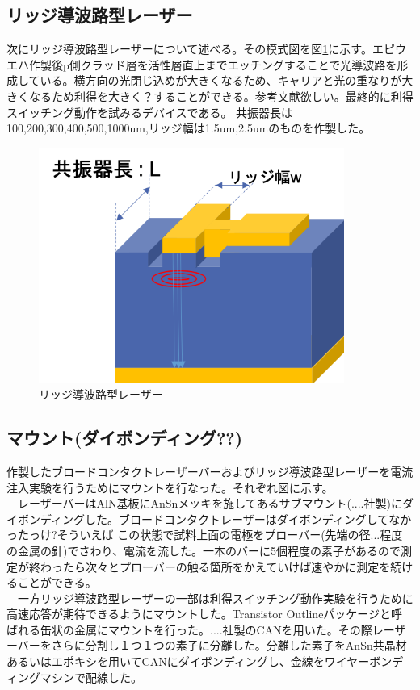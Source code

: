 \subsection{リッジ導波路型レーザー}%
次にリッジ導波路型レーザーについて述べる。その模式図を図\ref{fig_2_1_ridge}に示す。エピウエハ作製後p側クラッド層を活性層直上までエッチングすることで光導波路を形成している。横方向の光閉じ込めが大きくなるため、キャリアと光の重なりが大きくなるため利得を大きく？することができる。参考文献欲しい。最終的に利得スイッチング動作を試みるデバイスである。
共振器長は100,200,300,400,500,1000um,リッジ幅は1.5um,2.5umのものを作製した。
\begin{figure}[t]
	\centering
	\includegraphics[width=10cm]{figure/fig_2_1_ridge.png}
	\caption{リッジ導波路型レーザー}
	\label{fig_2_1_ridge}
\end{figure}

\subsection{マウント(ダイボンディング??)}%
作製したブロードコンタクトレーザーバーおよびリッジ導波路型レーザーを電流注入実験を行うためにマウントを行なった。それぞれ図に示す。\\
　レーザーバーはAlN基板にAnSnメッキを施してあるサブマウント(....社製)にダイボンディングした。ブロードコンタクトレーザーはダイボンディングしてなかったっけ?そういえば
この状態で試料上面の電極をプローバー(先端の径...程度の金属の針)でさわり、電流を流した。一本のバーに5個程度の素子があるので測定が終わったら次々とプローバーの触る箇所をかえていけば速やかに測定を続けることができる。\\
　一方リッジ導波路型レーザーの一部は利得スイッチング動作実験を行うために高速応答が期待できるようにマウントした。Transistor Outlineパッケージと呼ばれる缶状の金属にマウントを行った。....社製のCANを用いた。その際レーザーバーをさらに分割し１つ１つの素子に分離した。分離した素子をAnSn共晶材あるいはエポキシを用いてCANにダイボンディングし、金線をワイヤーボンディングマシンで配線した。


